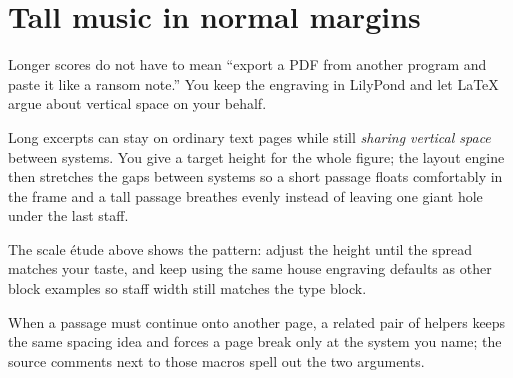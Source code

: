 \section{Tall music in normal margins}

Longer scores do not have to mean ``export a PDF from another program and paste it like a ransom note.'' You keep the engraving in LilyPond and let LaTeX argue about vertical space on your behalf.

Long excerpts can stay on ordinary text pages while still \emph{sharing vertical space} between systems. You give a target height for the whole figure; the layout engine then stretches the gaps between systems so a short passage floats comfortably in the frame and a tall passage breathes evenly instead of leaving one giant hole under the last staff.

\beginFixedHeightMusicExample{0.50\textheight}
\finishFixedHeightMusicExample
\finishBookExample

The scale étude above shows the pattern: adjust the height until the spread matches your taste, and keep using the same house engraving defaults as other block examples so staff width still matches the type block.

When a passage must continue onto another page, a related pair of helpers keeps the same spacing idea and forces a page break only at the system you name; the source comments next to those macros spell out the two arguments.
